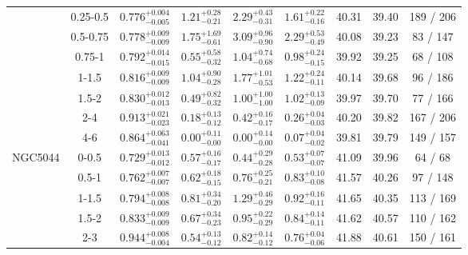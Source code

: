 \documentclass[structabstract]{aa}
\begin{document}
{{\begin{longtable}{lcccccccc}
 & 0.25-0.5 & $ 0.776 _{- 0.005 }^{+ 0.004 } $ & $  1.21 _{-  0.21 }^{+  0.28 } $ & $  2.29 _{-  0.31 }^{+  0.43 } $ & $  1.61 _{-  0.16 }^{+  0.22 } $ &  40.31 & 39.40 &   189 /   206 \\
 & 0.5-0.75 & $ 0.778 _{- 0.009 }^{+ 0.009 } $ & $  1.75 _{-  0.61 }^{+  1.69 } $ & $  3.09 _{-  0.90 }^{+  0.96 } $ & $  2.29 _{-  0.49 }^{+  0.53 } $ &  40.08 & 39.23 &    83 /   147 \\
 & 0.75-1 & $ 0.792 _{- 0.015 }^{+ 0.014 } $ & $  0.55 _{-  0.32 }^{+  0.58 } $ & $  1.04 _{-  0.68 }^{+  0.74 } $ & $  0.98 _{-  0.15 }^{+  0.24 } $ &  39.92 & 39.25 &    68 /   108 \\
 & 1-1.5 & $ 0.816 _{- 0.009 }^{+ 0.009 } $ & $  1.04 _{-  0.28 }^{+  0.90 } $ & $  1.77 _{-  0.53 }^{+  1.01 } $ & $  1.22 _{-  0.11 }^{+  0.24 } $ &  40.14 & 39.68 &    96 /   186 \\
 & 1.5-2 & $ 0.830 _{- 0.013 }^{+ 0.012 } $ & $  0.49 _{-  0.32 }^{+  0.82 } $ & $  1.00 _{-  1.00 }^{+  1.00 } $ & $  1.02 _{-  0.09 }^{+  0.13 } $ &  39.97 & 39.70 &    77 /   166 \\
 & 2-4 & $ 0.913 _{- 0.023 }^{+ 0.021 } $ & $  0.18 _{-  0.12 }^{+  0.13 } $ & $  0.42 _{-  0.17 }^{+  0.16 } $ & $  0.26 _{-  0.03 }^{+  0.04 } $ &  40.20 & 39.82 &   167 /   206 \\
 & 4-6 & $ 0.864 _{- 0.041 }^{+ 0.063 } $ & $  0.00 _{-  0.00 }^{+  0.11 } $ & $  0.00 _{-  0.00 }^{+  0.14 } $ & $  0.07 _{-  0.02 }^{+  0.04 } $ &  39.81 & 39.79 &   149 /   157 \\
\hline
NGC5044 & 0-0.5 & $ 0.729 _{- 0.012 }^{+ 0.013 } $ & $  0.57 _{-  0.17 }^{+  0.16 } $ & $  0.44 _{-  0.28 }^{+  0.29 } $ & $  0.53 _{-  0.07 }^{+  0.07 } $ &  41.09 & 39.96 &    64 /    68 \\
 & 0.5-1 & $ 0.762 _{- 0.007 }^{+ 0.007 } $ & $  0.62 _{-  0.15 }^{+  0.18 } $ & $  0.76 _{-  0.21 }^{+  0.25 } $ & $  0.83 _{-  0.08 }^{+  0.10 } $ &  41.57 & 40.26 &    97 /   148 \\
 & 1-1.5 & $ 0.794 _{- 0.008 }^{+ 0.008 } $ & $  0.81 _{-  0.20 }^{+  0.34 } $ & $  1.29 _{-  0.29 }^{+  0.46 } $ & $  0.92 _{-  0.11 }^{+  0.16 } $ &  41.65 & 40.35 &   113 /   169 \\
 & 1.5-2 & $ 0.833 _{- 0.009 }^{+ 0.009 } $ & $  0.67 _{-  0.23 }^{+  0.34 } $ & $  0.95 _{-  0.29 }^{+  0.22 } $ & $  0.84 _{-  0.11 }^{+  0.14 } $ &  41.62 & 40.57 &   110 /   162 \\
 & 2-3 & $ 0.944 _{- 0.004 }^{+ 0.008 } $ & $  0.54 _{-  0.12 }^{+  0.13 } $ & $  0.82 _{-  0.12 }^{+  0.14 } $ & $  0.76 _{-  0.06 }^{+  0.04 } $ &  41.88 & 40.61 &   150 /   161 \\

\end{longtable}}}
\end{document}
